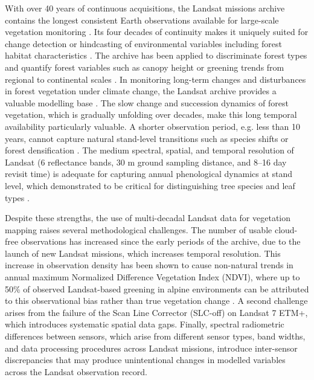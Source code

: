 \documentclass[essd, manuscript]{copernicus}
\begin{document}
With over 40 years of continuous acquisitions, the Landsat missions archive contains the longest consistent Earth observations available for large-scale vegetation monitoring \citep{wulder_fifty_2022}. Its four decades of continuity makes it uniquely suited for change detection or hindcasting of environmental variables including forest habitat characteristics \citep{turubanova_tree_2023,bell_hindcasting_2024}. The archive has been applied to discriminate forest types and quantify forest variables such as canopy height or greening trends from regional to continental scales \citep{pflugmacher_mapping_2019,obuchowicz_change_2024,yel_remote_2026}. In monitoring long-term changes and disturbances in forest vegetation under climate change, the Landsat archive provides a valuable modelling base \citep{viana-soto_european_2025, grunig_climate_2026}. The slow change and succession dynamics of forest vegetation, which is gradually unfolding over decades, make this long temporal availability particularly valuable. A shorter observation period, e.g. less than 10 years, cannot capture natural stand-level transitions such as species shifts or forest densification \citep{tong_reforestation_2023, midolo_sixty_2026}. The medium spectral, spatial, and temporal resolution of Landsat (6 reflectance bands, 30 m ground sampling distance, and 8–16 day revisit time) is adequate for capturing annual phenological dynamics at stand level, which demonstrated to be critical for distinguishing tree species and leaf types \citep{hemmerling_mapping_2021,kollert_exploring_2021,wang_assessing_2022}. 

Despite these strengths, the use of multi-decadal Landsat data for vegetation mapping raises several methodological challenges. The number of usable cloud-free observations  has increased since the early periods of the archive, due to the launch of new Landsat missions, which increases temporal resolution. This increase in observation density has been shown to cause non-natural trends in annual maximum Normalized Difference Vegetation Index (NDVI), where up to 50\% of observed Landsat-based greening in alpine environments can be attributed to this observational bias rather than true vegetation change \citep{bayle_landsat-based_2024}. A second challenge arises from the failure of the Scan Line Corrector (SLC-off) on Landsat 7 ETM+, which introduces systematic spatial data gaps. Finally, spectral radiometric differences between sensors, which arise from different sensor types, band widths, and data processing procedures across Landsat missions, introduce inter-sensor discrepancies that may produce unintentional changes in modelled variables across the Landsat observation record.
\end{document}
